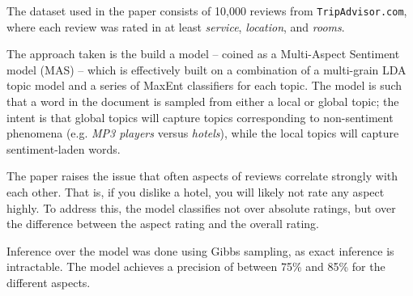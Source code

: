 \documentclass[12pt,letterpaper]{article}
\begin{document}
The dataset used in the paper consists of 10,000 reviews from {\tt TripAdvisor.com}, where each
review was rated in at least {\em service}, {\em location}, and {\em rooms}.

The approach taken is the build a model -- coined as a Multi-Aspect Sentiment model (MAS) --
	which is effectively built on a combination of a multi-grain LDA topic model and a series of MaxEnt
	classifiers for each topic.
The model is such that a word in the document is sampled from either a local or global topic;
	the intent is that global topics will capture topics corresponding to non-sentiment phenomena
	(e.g. {\em MP3 players} versus {\em hotels}), while the local topics will capture sentiment-laden
	words.

The paper raises the issue that often aspects of reviews correlate strongly with each other.
That is, if you dislike a hotel, you will likely not rate any aspect highly.
To address this, the model classifies not over absolute ratings, but over the difference between
	the aspect rating and the overall rating.

Inference over the model was done using Gibbs sampling, as exact inference is intractable.
The model achieves a precision of between 75\% and 85\% for the different aspects.



\end{document}
